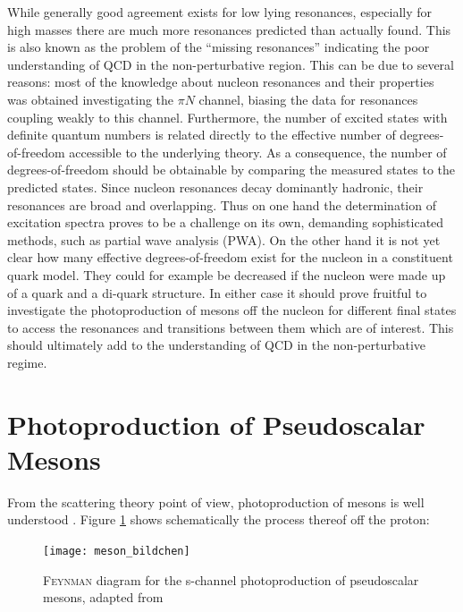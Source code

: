 While generally good agreement exists for low lying resonances, especially for high masses there are much more resonances predicted than actually found. This is also known as the problem of the \enquote{missing resonances} indicating the poor understanding of QCD in the non-perturbative region. This can be due to several reasons: most of the knowledge about nucleon resonances and their properties was obtained investigating the $\pi N$ channel, biasing the data for resonances coupling weakly to this channel. Furthermore, the number of excited states with definite quantum numbers is related directly to the effective number of degrees-of-freedom accessible to the underlying theory. As a consequence, the number of degrees-of-freedom should be obtainable by comparing the measured states to the predicted states. Since nucleon resonances decay dominantly hadronic, their resonances are broad and overlapping. Thus on one hand the determination of excitation spectra proves to be a challenge on its own, demanding sophisticated methods, such as partial wave analysis (PWA). On the other hand it is not yet clear how many effective degrees-of-freedom exist for the nucleon in a constituent quark model. They could for example be decreased if the nucleon were made up of a quark and a di-quark structure. In either case it should prove fruitful to investigate the photoproduction of mesons off the nucleon for different final states to access the resonances and transitions between them which are of interest. This should ultimately add to the understanding of QCD in the non-perturbative regime. \cite{Krusche}


\section{Photoproduction of Pseudoscalar Mesons}
From the scattering theory point of view, photoproduction of mesons is well understood \cite{Krusche}. Figure \ref{fig:mes_bildchen} shows schematically the process thereof off the proton:

\begin{figure}[htbp]
	\centering
	\texttt{[image: meson\_bildchen]}
	\caption{\textsc{Feynman} diagram for the s-channel photoproduction of pseudoscalar mesons, adapted from \cite{farahphd}}
	\label{fig:mes_bildchen}
\end{figure}

